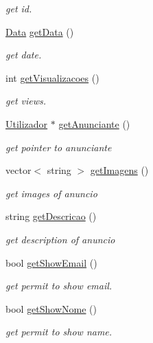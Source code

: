 \begin{DoxyCompactItemize}
\begin{DoxyCompactList}\small\item\em get id. \end{DoxyCompactList}\item 
\hyperlink{class_data}{Data} \hyperlink{class_anuncio_a982dde9675c7d6ac5260de9caebacf45}{get\+Data} ()
\begin{DoxyCompactList}\small\item\em get date. \end{DoxyCompactList}\item 
int \hyperlink{class_anuncio_a1c1bce5a9a380a84f84266772cec25aa}{get\+Visualizacoes} ()
\begin{DoxyCompactList}\small\item\em get views. \end{DoxyCompactList}\item 
\hyperlink{class_utilizador}{Utilizador} $\ast$ \hyperlink{class_anuncio_a60a25960ab815edf614c5a3c8df620ac}{get\+Anunciante} ()
\begin{DoxyCompactList}\small\item\em get pointer to anunciante \end{DoxyCompactList}\item 
vector$<$ string $>$ \hyperlink{class_anuncio_a392d83398dd5d2c746876279bbfa66ce}{get\+Imagens} ()
\begin{DoxyCompactList}\small\item\em get images of anuncio \end{DoxyCompactList}\item 
string \hyperlink{class_anuncio_a78d06816e12ad8d174394fa3a7e14a58}{get\+Descricao} ()
\begin{DoxyCompactList}\small\item\em get description of anuncio \end{DoxyCompactList}\item 
bool \hyperlink{class_anuncio_aeda31c33a934320461a013994aa5205b}{get\+Show\+Email} ()
\begin{DoxyCompactList}\small\item\em get permit to show email. \end{DoxyCompactList}\item 
bool \hyperlink{class_anuncio_ab34573cf72855debbfd3c8798d453944}{get\+Show\+Nome} ()
\begin{DoxyCompactList}\small\item\em get permit to show name. \end{DoxyCompactList}\item 

\end{DoxyCompactItemize}
